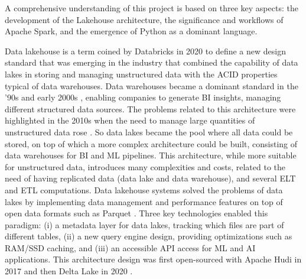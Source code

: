 A comprehensive understanding of this project is based on three key aspects: the development of the Lakehouse architecture, the significance and workflows of Apache Spark, and the emergence of Python as a dominant language.

Data lakehouse is a term coined by Databricks in 2020 \cite{WhatLakehouse2020} to define a new design standard that was emerging in the industry that combined the capability of data lakes in storing and managing unstructured data with the \gls{ACID} properties typical of data warehouses.
Data warehouses became a dominant standard in the '90s and early 2000s \cite{chaudhuriOverviewDataWarehousing1997}, enabling companies to generate \gls{BI} insights, managing different structured data sources. The problems related to this architecture were highlighted in the 2010s when the need to manage large quantities of unstructured data rose \cite{ederUnstructuredData802008}. 
So data lakes became the pool where all data could be stored, on top of which a more complex architecture could be built, consisting of data warehouses for \gls{BI} and \gls{ML} pipelines.
This architecture, while more suitable for unstructured data, introduces many complexities and costs, related to the need of having replicated data (data lake and data warehouse), and several \gls{ELT} and \gls{ETL} computations.
Data lakehouse systems solved the problems of data lakes by implementing data management and performance features on top of open data formats such as Parquet \cite{DremelMadeSimple}. Three key technologies enabled this paradigm: (i) a metadata layer for data lakes, tracking which files are part of different tables, (ii) a new query engine design, providing optimizations such as RAM/SSD caching, and (iii) an accessible \gls{API} access for \gls{ML} and \gls{AI} applications. This architecture design was first open-sourced with Apache Hudi in 2017 \cite{rajaperumalUberEngineeringIncremental2017} and then Delta Lake in 2020 \cite{armbrustDeltaLakeHighperformance2020}.

